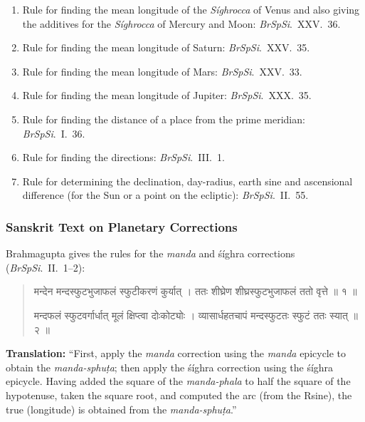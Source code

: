 \documentclass[11pt,a4paper]{article}
\newcommand{\dev}[1]{{\devanagarifont #1}}
\newenvironment{sanskritverse}{%
  \begin{quote}
  \devanagarifont
  \small
  \color{titlecolor}
}{\end{quote}}
\theoremstyle{definition}
\begin{document}
\begin{enumerate}
  \item Rule for finding the mean longitude of the \textit{S\'ighrocca} of Venus and also giving the additives for the \textit{S\'ighrocca} of Mercury and Moon: \textit{BrSpSi}.\ XXV.\ 36.
  
  \item Rule for finding the mean longitude of Saturn: \textit{BrSpSi}.\ XXV.\ 35.
  
  \item Rule for finding the mean longitude of Mars: \textit{BrSpSi}.\ XXV.\ 33.
  
  \item Rule for finding the mean longitude of Jupiter: \textit{BrSpSi}.\ XXX.\ 35.
  
  \item Rule for finding the distance of a place from the prime meridian: \textit{BrSpSi}.\ I.\ 36.
  
  \item Rule for finding the directions: \textit{BrSpSi}.\ III.\ 1.
  
  \item Rule for determining the declination, day-radius, earth sine and ascensional difference (for the Sun or a point on the ecliptic): \textit{BrSpSi}.\ II.\ 55.
\end{enumerate}


\subsubsection{Sanskrit Text on Planetary Corrections}

Brahmagupta gives the rules for the \textit{manda} and \'s\'ighra corrections (\textit{BrSpSi}.\ II.\ 1--2):

\begin{sanskritverse}
\dev{मन्देन मन्दस्फुटभुजाफलं स्फुटीकरणं कुर्यात् ।}
\dev{ततः शीघ्रेण शीघ्रस्फुटभुजाफलं ततो वृत्ते ॥ १ ॥}

\dev{मन्दफलं स्फुटवर्गार्धात् मूलं क्षिप्त्वा दोःकोट्योः ।}
\dev{व्यासार्धहतचापं मन्दस्फुटतः स्फुटं ततः स्यात् ॥ २ ॥}
\end{sanskritverse}

\textbf{Translation:} ``First, apply the \textit{manda} correction using the \textit{manda} epicycle to obtain the \textit{manda-sphu\d{t}a}; then apply the \'s\'ighra correction using the \'s\'ighra epicycle. Having added the square of the \textit{manda-phala} to half the square of the hypotenuse, taken the square root, and computed the arc (from the Rsine), the true (longitude) is obtained from the \textit{manda-sphu\d{t}a}.''
\end{document}
